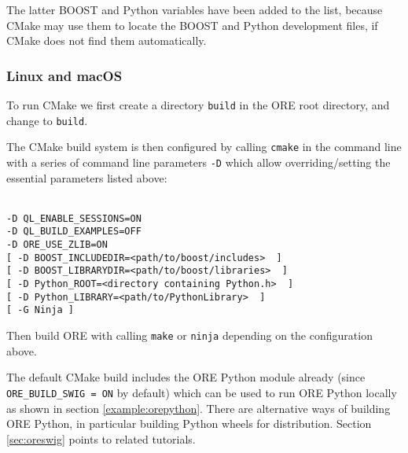 The latter BOOST and Python variables have been added to the list, because CMake may use them to locate
the BOOST and Python development files, if CMake does not find them automatically.

\subsubsection*{Linux and macOS}
  
To run CMake we first create a directory {\tt build} in the ORE root directory, and change to {\tt build}.
    
The CMake build system is then configured by calling {\tt cmake} in the command line with a series of
command line parameters {\tt -D} which allow overriding/setting the essential parameters listed above:

\medskip
\hspace{1cm}{\tt cmake .. \bs} \\
\hspace{2cm} {\tt -D QL\_ENABLE\_SESSIONS=ON \bs } \\
\hspace{2cm} {\tt -D QL\_BUILD\_EXAMPLES=OFF \bs } \\
\hspace{2cm} {\tt -D ORE\_USE\_ZLIB=ON \bs}  \\
\hspace{2cm} {\tt [ -D BOOST\_INCLUDEDIR=<path/to/boost/includes> \bs ~] } \\
\hspace{2cm} {\tt [ -D BOOST\_LIBRARYDIR=<path/to/boost/libraries> \bs ~] } \\
\hspace{2cm} {\tt [ -D Python\_ROOT=<directory containing Python.h> \bs ~] } \\
\hspace{2cm} {\tt [ -D Python\_LIBRARY=<path/to/PythonLibrary> \bs ~] } \\
\hspace{2cm} {\tt [ -G Ninja ] } 
  
\medskip
Then build ORE with calling {\tt make} or {\tt ninja} depending on the configuration above.

\medskip
The default CMake build includes the ORE Python module already (since {\tt ORE\_BUILD\_SWIG = ON} by default) which can
be used to run ORE Python locally as shown in section \ref{example:orepython}.
There are alternative ways of building ORE Python, in particular building Python wheels for distribution.
Section \ref{sec:oreswig} points to related tutorials.

